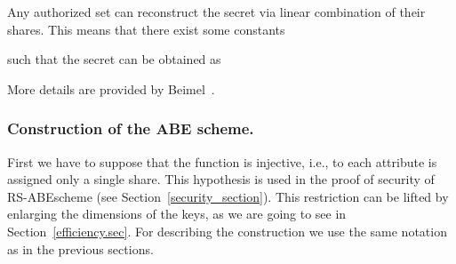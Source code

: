 \documentclass[a4paper,10pt]{article}
\begin{document}
Any authorized set  can reconstruct the secret via linear combination of their shares. This means that there exist some constants 
			
			such that the secret  can be obtained as
			
			More details are provided by Beimel~\cite{beimel1996SSS}.



\subsubsection{Construction of the ABE scheme.}\label{ABE.construction}
First we have to suppose that the function  is injective, i.e., to each attribute is assigned only a single share. This hypothesis is used in the proof of security of  RS-ABE\@ scheme (see Section~\ref{security_section}). This restriction can be lifted by enlarging the dimensions of the keys, as we are going to see in Section~\ref{efficiency.sec}. For describing the construction we use the same notation as in the previous sections.
\end{document}
